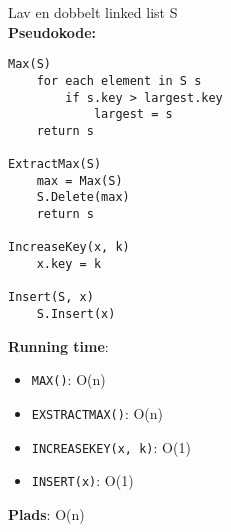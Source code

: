Lav en dobbelt linked list S\\
\textbf{Pseudokode:}
\begin{lstlisting}[frame=single, mathescape=true]
Max(S)
	for each element in S s
		if s.key > largest.key
			largest = s
	return s

ExtractMax(S)
	max = Max(S)
	S.Delete(max)
	return s

IncreaseKey(x, k)
	x.key = k

Insert(S, x)
	S.Insert(x)
\end{lstlisting}
\textbf{Running time}:
\begin{itemize}
	\item \texttt{MAX()}: O(n)
	\item \texttt{EXSTRACTMAX()}: O(n)
	\item \texttt{INCREASEKEY(x, k)}: O(1)
	\item \texttt{INSERT(x)}: O(1)
\end{itemize}
\textbf{Plads}: O(n)
